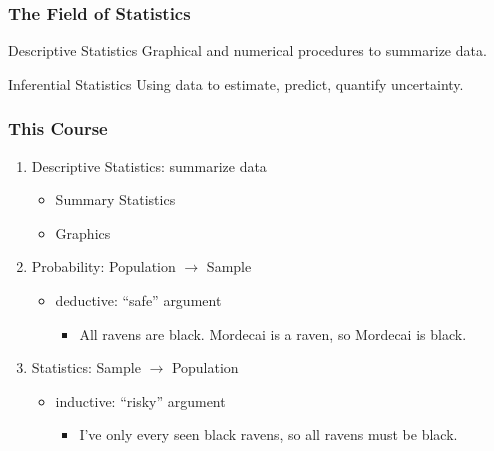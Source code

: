 \documentclass[handout]{beamer}
\begin{document}


\begin{frame}

\frametitle{The Field of Statistics}

\begin{block}{Descriptive Statistics}
Graphical and numerical procedures to summarize data.
\end{block}


\begin{block}{Inferential Statistics}
Using data to estimate, predict, quantify uncertainty.
\end{block}


\end{frame}

\begin{frame}

\frametitle{This Course}

\begin{enumerate}
	\item Descriptive Statistics: summarize data
		\begin{itemize}
			\item Summary Statistics
			\item Graphics
		\end{itemize}
	\item Probability: Population $\rightarrow$ Sample
		\begin{itemize}
			\item deductive: ``safe'' argument
				\begin{itemize}
					\item All ravens are black. Mordecai is a raven, so Mordecai is black.
				\end{itemize}
		\end{itemize}
	\item Statistics: Sample $\rightarrow$ Population
		\begin{itemize}
			\item inductive: ``risky'' argument
				\begin{itemize}
					\item I've only every seen black ravens, so all ravens must be black.
				\end{itemize}
		 \end{itemize}
\end{enumerate}


\end{frame}
\end{document}
